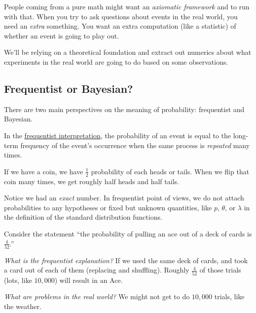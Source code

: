 People coming from a pure math might want an \emph{axiomatic framework} and to run with that. When you try to ask questions about events in the real world, you need an \emph{extra} something. You want an extra computation (like a statistic) of whether an event is going to play out.

We'll be relying on a theoretical foundation and extract out numerics about what experiments in the real world are going to do based on some observations.

\subsection{Frequentist or Bayesian?}

There are two main perspectives on the meaning of probability: frequentist and Bayesian.

\begin{definition}
    In the \ul{frequentist interpretation}, the probability of an event is equal to the long-term frequency of the event's occurrence when the same process is \emph{repeated} many times.

    If we have a coin, we have $\frac{1}{2}$ probability of each heads or tails. When we flip that coin many times, we get roughly half heads and half tails.

    Notice we had an \emph{exact} number. In frequentist point of views, we do not attach probabilities to any hypotheses or fixed but unknown quantities, like $p$, $\theta$, or $\lambda$ in the definition of the standard distribution functions.
\end{definition}
\begin{example}
    Consider the statement ``the probability of pulling an ace out of a deck of cards is $\frac{4}{52}$.''

    \emph{What is the frequentist explanation?} If we used the same deck of cards, and took a card out of each of them (replacing and shuffling). Roughly $\frac{4}{52}$ of those trials (lots, like $10,000$) will result in an Ace.

    \emph{What are problems in the real world?} We might not get to do $10,000$ trials, like the weather.
\end{example}

